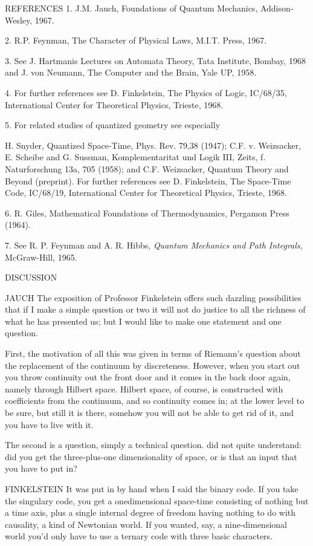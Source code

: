REFERENCES
1.
J.M. Jauch, Foundations of Quantum Mechanics, Addison­Wesley, 1967.

2.
R.P. Feynman, The Character of Physical Laws, M.I.T. Press, 1967.

3.
See J. Hartmanis Lectures on Automata Theory, Tata Institute, Bombay, 1968 and J. von Neumann, The Computer and the Brain, Yale UP, 1958.

4.
For further references see D. Finkelstein, The Physics of Logic, IC/68/35, International Center for Theoretical Physics, Trieste, 1968.

5.
For related studies of quantized geometry see especially

H. Snyder, Quantized Space-Time, Phys. Rev. 79,38 (1947);
C.F. v. Weizsacker, E. Scheibe and G. Sussman, Komplementaritat und Logik III, Zeits, f. Naturforschung 13a, 705 (1958); and C.F. Weizsacker, Quantum Theory and Beyond (preprint). For further references see D. Finkelstein, The Space-Time Code, IC/68/19, International Center for Theoretical Physics, Trieste, 1968.

6.
R. Giles, Mathematical Foundations of Thermodynamics, Pergamon Press (1964).

7.
See R. P. Feynman and A. R. Hibbs,
{\em Quantum Mechanics and Path Integrals}, McGraw-Hill, 1965.

\bigskip\bigskip

DISCUSSION

JAUCH The exposition of Professor Finkelstein offers such dazzling possibilities
that if I make a simple question or two it will not do justice to all the
richness of what he has presented us; but I would like to make one statement and
one question.

First, the motivation of all this was given in terms of Riemann's question about
the replacement of the continuum by discreteness. However, when you start out you
throw continuity out the front door and it comes in the back door again, namely
through Hilbert space. Hilbert space, of course, is constructed with coefficients
from the continuum, and so continuity comes in; at the lower level to be sure,
but still it is there, somehow you will not be able to get rid of it, and you
have to live with it.

The second is a question, simply a technical question. did not quite understand:
did you get the three-plus-one dimensionality of space, or is that an input that
you have to put in?

FINKELSTEIN It was put in by hand when I said the binary code. If you take the
singulary code, you get a one­dimensional space-time consisting of nothing but a
time axis, plus a single internal degree of freedom having nothing to do with
causality, a kind of Newtonian world. If you wanted, say, a nine-dimensional
world you'd only have to use a ternary code with three basic characters.

